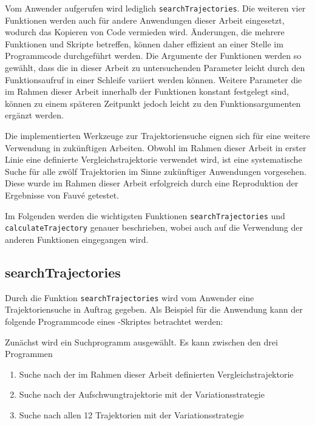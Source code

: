 Vom Anwender aufgerufen wird lediglich \texttt{searchTrajectories}. Die weiteren vier Funktionen werden auch für andere Anwendungen dieser Arbeit eingesetzt, wodurch das Kopieren von Code vermieden wird. Änderungen, die mehrere Funktionen und Skripte betreffen, können daher effizient an einer Stelle im Programmcode durchgeführt werden. Die Argumente der Funktionen werden so gewählt, dass die in dieser Arbeit zu untersuchenden Parameter leicht durch den Funktionsaufruf in einer Schleife variiert werden können. Weitere Parameter die im Rahmen dieser Arbeit innerhalb der Funktionen konstant festgelegt sind, können zu einem späteren Zeitpunkt jedoch leicht zu den Funktionsargumenten ergänzt werden.

Die implementierten Werkzeuge zur Trajektoriensuche eignen sich für eine weitere Verwendung in zukünftigen Arbeiten. Obwohl im Rahmen dieser Arbeit in erster Linie eine definierte Vergleichstrajektorie verwendet wird, ist eine systematische Suche für alle zwölf Trajektorien im Sinne zukünftiger Anwendungen vorgesehen. Diese wurde im Rahmen dieser Arbeit erfolgreich durch eine Reproduktion der Ergebnisse von Fauvé \cite{fauve} getestet.

Im Folgenden werden die wichtigsten Funktionen \texttt{searchTrajectories} und \texttt{calculateTrajectory} genauer beschrieben, wobei auch auf die Verwendung der anderen Funktionen eingegangen wird.




\subsection{searchTrajectories}\label{subsec:searchtrj}

Durch die Funktion \texttt{searchTrajectories} wird vom Anwender eine Trajektoriensuche in Auftrag gegeben. Als Beispiel für die Anwendung kann der folgende Programmcode eines \Matlab-Skriptes betrachtet werden:



Zunächst wird ein Suchprogramm ausgewählt. Es kann zwischen den drei Programmen

\begin{enumerate}
	\item Suche nach der im Rahmen dieser Arbeit definierten Vergleichstrajektorie
	\item Suche nach der Aufschwungtrajektorie mit der Variationsstrategie
	\item Suche nach allen 12 Trajektorien mit der Variationsstrategie
\end{enumerate}

